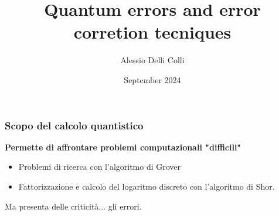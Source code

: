 \documentclass[aspectratio=169]{beamer}
\title{Quantum errors and error corretion tecniques}
\author{Alessio Delli Colli}
\date{September 2024}
\begin{document}
\maketitle

%

\begin{frame}
	\frametitle{Scopo del calcolo quantistico}
	\textbf{Permette di affrontare problemi computazionali "difficili"}

	\pause
	\vspace{30pt}
	\begin{itemize}
		\item Problemi di ricerca con l'algoritmo di Grover
		      \vspace{30pt}
		      \pause
		\item Fattorizzazione e calcolo del logaritmo discreto con l'algoritmo di Shor.


	\end{itemize}
	\vspace{20pt}
	\pause
	Ma presenta delle criticità...
	\pause
	gli errori.
\end{frame}
\end{document}
